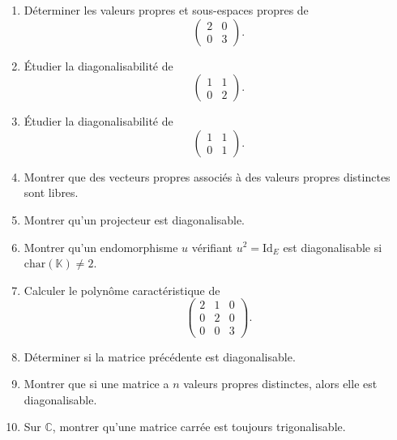 \documentclass[11pt,a4paper]{article}
\theoremstyle{remark}
\newcommand{\C}{\mathbb{C}}
\newcommand{\K}{\mathbb{K}}
\newcommand{\id}{\mathrm{Id}}
\begin{document}
\begin{enumerate}[label=\textbf{Exercice \arabic*.}]
    \item Déterminer les valeurs propres et sous-espaces propres de
    \[
    \begin{pmatrix}
    2 & 0\\
    0 & 3
    \end{pmatrix}.
    \]

    \item Étudier la diagonalisabilité de
    \[
    \begin{pmatrix}
    1 & 1\\
    0 & 2
    \end{pmatrix}.
    \]

    \item Étudier la diagonalisabilité de
    \[
    \begin{pmatrix}
    1 & 1\\
    0 & 1
    \end{pmatrix}.
    \]

    \item Montrer que des vecteurs propres associés à des valeurs propres distinctes sont libres.

    \item Montrer qu’un projecteur est diagonalisable.

    \item Montrer qu’un endomorphisme \(u\) vérifiant \(u^2=\id_E\) est diagonalisable si \(\mathrm{char}(\K)\neq 2\).

    \item Calculer le polynôme caractéristique de
    \[
    \begin{pmatrix}
    2 & 1 & 0\\
    0 & 2 & 0\\
    0 & 0 & 3
    \end{pmatrix}.
    \]

    \item Déterminer si la matrice précédente est diagonalisable.

    \item Montrer que si une matrice a \(n\) valeurs propres distinctes, alors elle est diagonalisable.

    \item Sur \(\C\), montrer qu’une matrice carrée est toujours trigonalisable.
\end{enumerate}
\end{document}
